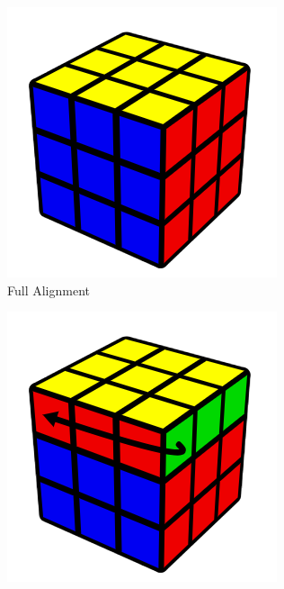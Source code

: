 \begin{figure}[h]
    \centering
    \begin{subfigure}{0.25\textwidth}
        \centering
        \includegraphics[width=.90\linewidth]{Figures/4 Protocol Design/Specification/fully-aligned.png}
        \caption{Full Alignment}
        \label{fig:rotation-aligned}
    \end{subfigure}%
    \begin{subfigure}{0.25\textwidth}
        \centering
        \includegraphics[width=.90\linewidth]{Figures/4 Protocol Design/Specification/90_misaligned.png}

\end{subfigure}
\end{figure}
